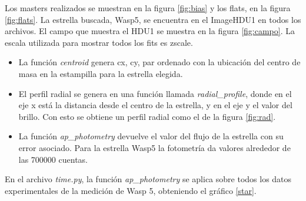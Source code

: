 \documentclass[a4paper, 11pt, spanish]{article}
\begin{document}
Los masters realizados se muestran en la figura \ref{fig:bias} y los flats, en la figura \ref{fig:flats}. La estrella buscada, Wasp5, se encuentra en el ImageHDU1 en todos los archivos. El campo que muestra el HDU1 se muestra en la figura \ref{fig:campo}. La escala utilizada para mostrar todos los fits es zscale.


\begin{itemize}
	\item La funci\'on \textit{centroid} genera cx, cy, par ordenado con la ubicaci\'on del centro de masa en la estampilla para la estrella elegida. 
	\item El perfil radial se genera en una funci\'on llamada \textit{radial\_profile}, donde en el eje x est\'a la distancia desde el centro de la estrella, y en el eje y el valor del brillo. Con esto se obtiene un perfil radial como el de la figura \ref{fig:rad}.
	\item La funci\'on \textit{ap\_photometry} devuelve el valor del flujo de la estrella con su error asociado. Para la estrella Wasp5 la fotometr\'ia da valores alrededor de las 700000 cuentas.
\end{itemize}

En el archivo \textit{time.py}, la funci\'on \textit{ap\_photometry} se aplica sobre todos los datos experimentales de la medici\'on  de Wasp 5, obteniendo el gr\'afico \ref{star}.
\end{document}
